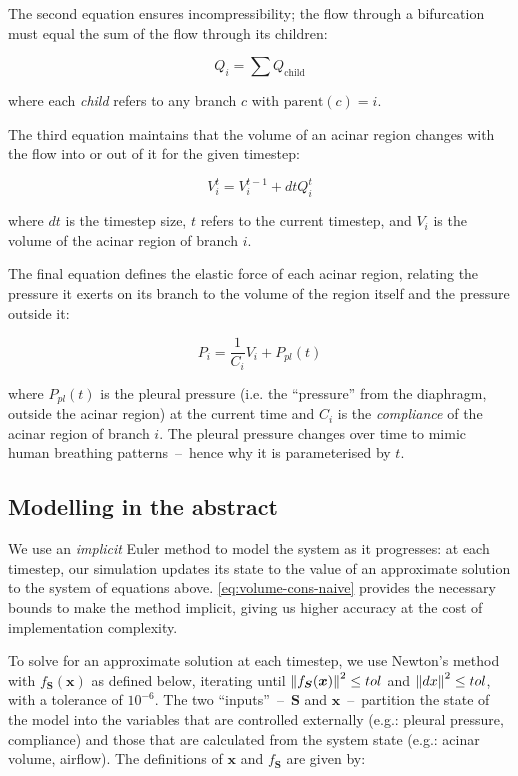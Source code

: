 The second equation ensures incompressibility; the flow through a bifurcation must equal the sum of
the flow through its children:

\begin{equation}
    Q_i = \sum Q_{\text{child}}
\end{equation}

\noindent
where each \textit{child} refers to any branch $c$ with $\text{parent}(c) = i$.

The third equation maintains that the volume of an acinar region changes with the flow into or out
of it for the given timestep:

\begin{equation}
    V_i^t = V_i^{t-1} + dt Q_i^t
\end{equation}

\noindent
where $dt$ is the timestep size, $t$ refers to the current timestep, and $V_i$ is the volume of the
acinar region of branch $i$.

The final equation defines the elastic force of each acinar region, relating the pressure it exerts
on its branch to the volume of the region itself and the pressure outside it:

\begin{equation} \label{eq:volume-cons-naive}
    P_i = \frac{1}{C_i} V_i + P_{pl}(t)
\end{equation}

\noindent
where $P_{pl}(t)$ is the pleural pressure (i.e. the ``pressure'' from the diaphragm, outside the
acinar region) at the current time and $C_i$ is the \textit{compliance} of the acinar region of
branch $i$. The pleural pressure changes over time to mimic human breathing patterns~--~hence why it
is parameterised by $t$.

\subsection{Modelling in the abstract} \label{sec:modelling-in-the-abstract}

We use an \textit{implicit} Euler method to model the system as it progresses: at each timestep, our
simulation updates its state to the value of an approximate solution to the system of equations
above. \autoref{eq:volume-cons-naive} provides the necessary bounds to make the method implicit,
giving us higher accuracy at the cost of implementation complexity.

To solve for an approximate solution at each timestep, we use Newton's method with $f_{\bm{S}}(\bm{x})$ as
defined below, iterating until $\left\lVert f_{\bm{S}}(\bm{x})\right\rVert^2 \le tol$ and $\left\lVert dx\right\rVert^2 \le tol$, with
a tolerance of $10^{-6}$. The two ``inputs''~--~$\bm{S}$ and $\bm{x}$~--~partition the state of the
model into the variables that are controlled externally (e.g.: pleural pressure, compliance) and
those that are calculated from the system state (e.g.: acinar volume, airflow). The definitions of
$\bm{x}$ and $f_{\bm{S}}$ are given by:

